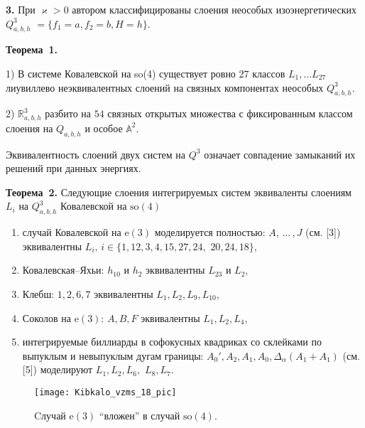 {%
\textbf{3.} При $\varkappa >0$ автором классифицированы слоения неособых изоэнергетических $Q^3_{a,b,h}$ $=\{f_1=a,f_2=b,H=h\}.$

\textbf{Теорема~1.}{
1) В системе Ковалевской на so(4) существует ровно $27$ классов $L_1, \dots L_{27}$ лиувиллево неэквивалентных слоений на связных компонентах неособых $Q^3_{a, b, h}$.%

2) $\mathbb{R}^3_{a, b, h}$ разбито на $54$ связных открытых множества с фиксированным классом слоения на $Q_{a, b, h}$ и особое $\mathbb{A}^2$.
}

Эквивалентность слоений двух систем на $Q^3$ означает совпадение замыканий их решений при данных энергиях.

\textbf{Теорема~2.}
Следующие слоения интегрируемых систем эквиваленты слоениям $L_i$ на $Q^3_{a, b, h}$ Ковалевской на $\mathrm{so}(4)$
\begin{enumerate}
	\item
		случай Ковалевской на $\mathrm{e}(3)$  моделируется полностью:
		\linebreak
		$A,\, ...\, ,J$ (см. [3]) эквивалентны $L_i,\, i \in \{1, 12, 3, 4, 15, 27, 24,$ $ 20, 24, 18\}$, %

	\item
		Ковалевская--Яхьи: $h_{10}$ и $h_{2}$ эквивалентны $L_{23}$ и  $L_2$,

	\item
		Клебш:  $1, 2, 6, 7$ эквивалентны $L_1, L_2, L_9, L_{10}$,

	\item
		Соколов на $\mathrm{e}(3)$: $A, B, F$ эквивалентны $L_1, L_2, L_4$,

	\item
		интегрируемые биллиарды в софокусных квадриках со
		\linebreak
		склейками по выпуклым и невыпуклым дугам границы:
		$A_0', A_2, A_1, A_0, \Delta_{\alpha}(A_1+A_1)$ (см. [5])  моделируют $L_1, L_2, L_6,$ $L_8, L_7$.
\end{enumerate}

\begin{figure}[!htb]
%
\begin{center}
\texttt{[image: Kibkalo\_vzms\_18\_pic]}
   \caption{Cлучай $\mathrm{e}(3)$ ``вложен'' в случай $\mathrm{so}(4)$.}
\endminipage
\end{center}
\end{figure}


}
